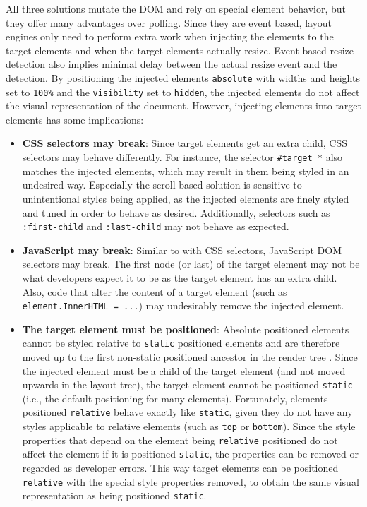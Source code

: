 \documentclass[a4paper,11pt]{kth-mag}
\newcommand{\code}[1]{\texttt{#1}}
\begin{document}
        All three solutions mutate the \gls{DOM} and rely on special \gls{element} behavior, but they offer many advantages over polling.
        Since they are event based, \glspl{layout engine} only need to perform extra work when injecting the \glspl{element} to the target \glspl{element} and when the target \glspl{element} actually resize.
        Event based resize detection also implies minimal delay between the actual resize event and the detection.
        By positioning the injected \glspl{element} \code{absolute} with widths and heights set to \code{100\%} and the \code{visibility} set to \code{hidden}, the injected \glspl{element} do not affect the visual representation of the \gls{document}.
        However, injecting \glspl{element} into target \glspl{element} has some implications:
        \begin{itemize}
          \item \textbf{\gls{CSS} selectors may break}:
            Since target \glspl{element} get an extra child, \gls{CSS} selectors may behave differently.
            For instance, the selector \code{\#target~*} also matches the injected \glspl{element}, which may result in them being styled in an undesired way.
            Especially the scroll-based solution is sensitive to unintentional styles being applied, as the injected \glspl{element} are finely styled and tuned in order to behave as desired.
            Additionally, selectors such as \code{:first-child} and \code{:last-child} may not behave as expected.
          \item \textbf{\gls{JavaScript} may break}:
            Similar to with \gls{CSS} selectors, \gls{JavaScript} \gls{DOM} selectors may break.
            The first node (or last) of the target \gls{element} may not be what developers expect it to be as the target element has an extra child.
            Also, code that alter the content of a target \gls{element} (such as \code{element.InnerHTML = ...}) may undesirably remove the injected \gls{element}.
          \item \textbf{The target \gls{element} must be positioned}:
            Absolute positioned \glspl{element} cannot be styled relative to \code{static} positioned \glspl{element} and are therefore moved up to the first non-static positioned ancestor in the render tree \cite{w3c_visuren}.
            Since the injected element must be a child of the target \gls{element} (and not moved upwards in the layout tree), the target \gls{element} cannot be positioned \code{static} (i.e., the default positioning for many \glspl{element}).
            Fortunately, \glspl{element} positioned \code{relative} behave exactly like \code{static}, given they do not have any styles applicable to relative \glspl{element} (such as \code{top} or \code{bottom}).
            Since the style properties that depend on the \gls{element} being \code{relative} positioned do not affect the \gls{element} if it is positioned \code{static}, the properties can be removed or regarded as developer errors.
            This way target \glspl{element} can be positioned \code{relative} with the special style properties removed, to obtain the same visual representation as being positioned \code{static}.
        \end{itemize}
\end{document}

